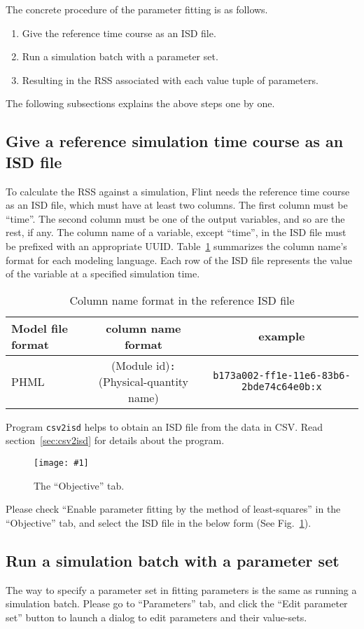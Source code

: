 \documentclass[a4paper,10pt]{report}
\newcommand{\filename}[1]{{\tt #1}}
\newcommand\FigureOfImage[2]{\begin{figure}[h]
  \centering
  \texttt{[image: \#1]}
  \caption{#2}\label{fig:#1}
\end{figure}}
\begin{document}
The concrete procedure of the parameter fitting is as follows.
\begin{enumerate}
\item Give the reference time course as an ISD file.
\item Run a simulation batch with a parameter set.
\item Resulting in the RSS associated with each value tuple of parameters.
\end{enumerate}
The following subsections explains the above steps one by one.

\subsection{Give a reference simulation time course  as an ISD file}
To calculate the RSS against a simulation, Flint needs the reference time course
as an ISD file, which must have at least two columns.
The first column must be ``time''. The second column must be one of the output
variables, and so are the rest, if any.
The column name of a variable, except ``time'', in the ISD file must be prefixed
with an appropriate UUID.
Table~\ref{tab:columnnameformat} summarizes the column name's format for each
modeling language.
Each row of the ISD file represents the value of the variable at a specified
simulation time.

\begin{table}
\centering
\caption{Column name format in the reference ISD file} \label{tab:columnnameformat}
\begin{tabular}{l|c|c}
  Model file format & column name format & example \\
  \hline
  PHML & (Module id){\tt :}(Physical-quantity name) & {\tt b173a002-ff1e-11e6-83b6-2bde74c64e0b:x}\\
\end{tabular}
\end{table}

Program \filename{csv2isd} helps to obtain an ISD file from the data in CSV.
Read section~\ref{sec:csv2isd} for details about the program.

\FigureOfImage{parameter-fitting-objective}{The ``Objective'' tab.}

Please check ``Enable parameter fitting by the method of least-squares'' in the
``Objective'' tab, and select the ISD file in the below form (See
Fig.~\ref{fig:parameter-fitting-objective}).

\subsection{Run a simulation batch with a parameter set}
The way to specify a parameter set in fitting parameters is the same as running
a simulation batch. Please go to ``Parameters'' tab, and click the ``Edit parameter
set'' button to launch a dialog to edit parameters and their value-sets.
\end{document}
